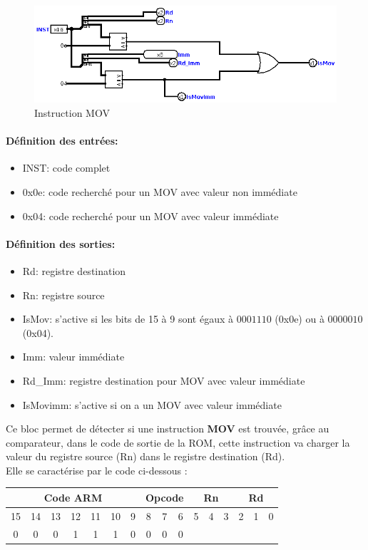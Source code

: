 \documentclass[a4paper]{article} %
\begin{document}
\begin{figure}[H]
    \centering
    \includegraphics[width=.8\textwidth]{src/Et4_MOV_INST.png}
    \caption{Instruction MOV}
    \label{mov_img}
\end{figure}
\paragraph{Définition des entrées:}
\begin{itemize}
    \item     INST: code complet
    \item     0x0e: code recherché pour un MOV avec valeur non immédiate
    \item     0x04: code recherché pour un MOV avec valeur immédiate
\end{itemize}

\paragraph{Définition des sorties:}
\begin{itemize}
    \item     Rd: registre destination
    \item     Rn: registre source
    \item     IsMov: s'active si les bits de 15 à 9 sont égaux à $0001110$ (0x0e) ou à $0000010$ (0x04).
    \item     Imm: valeur immédiate
    \item     Rd\_Imm: registre destination pour MOV avec valeur immédiate
    \item     IsMovimm: s'active si on a un MOV avec valeur immédiate

\end{itemize}

\medskip

Ce bloc permet de détecter si une instruction \textbf{MOV} est trouvée, grâce au comparateur, dans le code de sortie de la ROM, cette instruction va charger la valeur du registre source (Rn) dans le registre destination (Rd).\\
Elle se caractérise par le code ci-dessous : 
\\
\begin{tabular}{|ccccccc|ccc|ccc|ccc|}
    \hline
    \multicolumn{7}{|c|}{Code ARM}  & \multicolumn{3}{|c|}{Opcode} & \multicolumn{3}{|c|}{Rn} & \multicolumn{3}{|c|}{Rd}\\
    \hline
    15 & 14 & 13 & 12 & 11 & 10 & 9 & 8 & 7 & 6                    & 5 & 4 & 3                & 2 & 1 & 0 \\
    \hline
    0  & 0  & 0  & 1  & 1  & 1  & 0 & 0 & 0 & 0                    & \multicolumn{3}{|c|}{}   & \multicolumn{3}{|c|}{}\\
    \hline     
    \end{tabular}
\\
\end{document}
